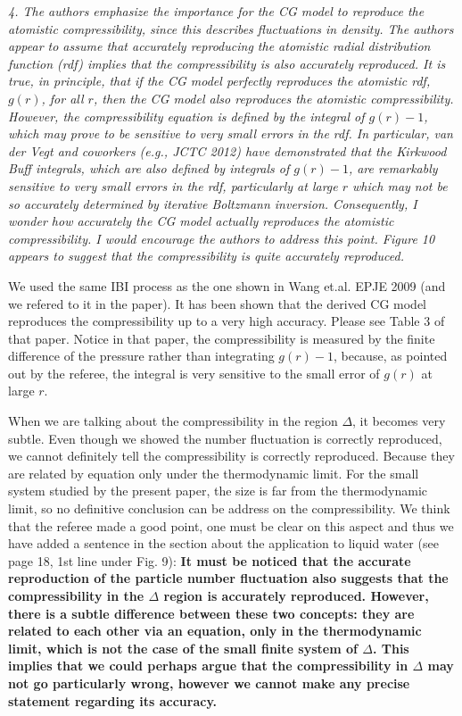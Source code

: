 \documentclass[a4paper]{article}
\begin{document}
\textit{
4. The authors emphasize the importance for the CG model to reproduce
the atomistic compressibility, since this describes fluctuations in
density. The authors appear to assume that accurately reproducing the
atomistic radial distribution function (rdf) implies that the
compressibility is also accurately reproduced. It is true, in
principle, that if the CG model perfectly reproduces the atomistic
rdf, $g(r)$, for all $r$, then the CG model also reproduces the atomistic
compressibility. However, the compressibility equation is defined by
the integral of $g(r)-1$, which may prove to be sensitive to very
small errors in the rdf. In particular, van der Vegt and coworkers
(e.g., JCTC 2012) have demonstrated that the Kirkwood Buff integrals,
which are also defined by integrals of $g(r)-1$, are remarkably
sensitive to very small errors in the rdf, particularly at large $r$
which may not be so accurately determined by iterative Boltzmann
inversion. Consequently, I wonder how accurately the CG model actually
reproduces the atomistic compressibility. I would encourage the
authors to address this point. Figure 10 appears to suggest that the
compressibility is quite accurately reproduced.
}

We used the same IBI process as the one shown in Wang et.al. EPJE
2009 (and we refered to it in the paper).  It has been shown that the derived CG model reproduces the
compressibility up to a very high accuracy. Please see Table 3 of that
paper.
Notice in that paper, the compressibility is measured by the
finite  difference of the pressure rather than integrating $g(r)-1$,
because, as pointed out by the referee, the integral is very sensitive
to the small error of $g(r)$ at large $r$.

When we are talking about the compressibility in the region $\Delta$,
it becomes very subtle. Even though we showed the number fluctuation
is correctly reproduced, we cannot definitely tell the compressibility
is correctly reproduced. Because they are related by equation only
under the thermodynamic limit.  For the small system studied by the
present paper, the size is far from the thermodynamic limit, so no
definitive conclusion can be address on the compressibility.
We think that the referee made a good point, one must be clear on this aspect and thus we have added a sentence in the section about the application to liquid water (see page 18, 1st line under Fig. 9): {\bf It must be noticed that the accurate reproduction of the particle number fluctuation also suggests that the compressibility in the $\Delta$ region is accurately reproduced. However, there is a subtle difference between these two concepts: they are related to each other via an equation, only in the thermodynamic limit, which is not the case of the small finite system of $\Delta$. This implies that we could perhaps argue that the compressibility in $\Delta$ may not go particularly wrong, however we cannot make any precise statement regarding its accuracy.}
\\
\end{document}
